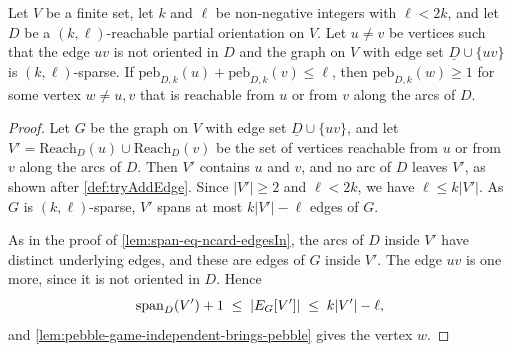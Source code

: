 \begin{lemma}
  \label{lem:pebble-game-independent-brings-pebble-graph}
  \leanok
  Let $V$ be a finite set, let $k$ and $\ell$ be non-negative integers
  with $\ell < 2k$, and let $D$ be a $(k, \ell)$-reachable partial
  orientation on $V$. Let $u \ne v$ be vertices such that the edge $uv$
  is not oriented in $D$ and the graph on $V$ with edge set
  $\underline{D} \cup \{uv\}$ is $(k, \ell)$-sparse. If
  $\mathrm{peb}_{D, k}(u) + \mathrm{peb}_{D, k}(v) \le \ell$, then
  $\mathrm{peb}_{D, k}(w) \ge 1$ for some vertex $w \ne u, v$ that is
  reachable from $u$ or from $v$ along the arcs of $D$.
\end{lemma}
\begin{proof}
  \leanok
  Let $G$ be the graph on $V$ with edge set $\underline{D} \cup \{uv\}$,
  and let $V' = \mathrm{Reach}_D(u) \cup \mathrm{Reach}_D(v)$ be the set
  of vertices reachable from $u$ or from $v$ along the arcs of $D$. Then
  $V'$ contains $u$ and $v$, and no arc of $D$ leaves $V'$, as shown
  after \cref{def:tryAddEdge}. Since $|V'| \ge 2$ and $\ell < 2k$, we
  have $\ell \le k|V'|$. As $G$ is $(k, \ell)$-sparse, $V'$ spans at
  most $k|V'| - \ell$ edges of $G$.

  As in the proof of \cref{lem:span-eq-ncard-edgesIn}, the arcs of $D$
  inside $V'$ have distinct underlying edges, and these are edges of $G$
  inside $V'$. The edge $uv$ is one more, since it is not oriented in
  $D$. Hence
  \[
    \mathrm{span}_D(V') + 1 \;\le\; |\edgesIn[G]{V'}| \;\le\;
    k|V'| - \ell,
  \]
  and \cref{lem:pebble-game-independent-brings-pebble} gives the
  vertex $w$.
\end{proof}

